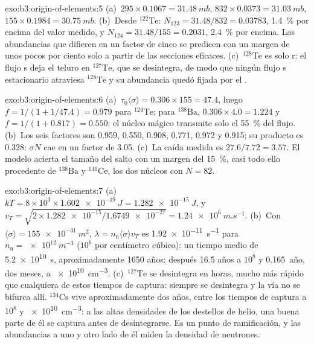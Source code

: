 \begin{solution}{exo:b3:origin-of-elements:5}
(a)~$295\times0.1067 = \qty{31.48}{mb}$, $832\times0.0373 =
\qty{31.03}{mb}$, $155\times0.1984 = \qty{30.75}{mb}$. (b)~Desde
$^{122}\mathrm{Te}$: $N_{123} = 31.48/832 = \num{0.03783}$, \qty{1.4}{\percent}
por encima del valor medido, y $N_{124} = 31.48/155 = \num{0.2031}$,
\qty{2.4}{\percent} por encima. Las abundancias que difieren en un factor de cinco se
predicen con un margen de unos pocos por ciento solo a partir de las secciones eficaces.
(c)~$^{128}\mathrm{Te}$ es solo r: el flujo s deja el teluro en
$^{127}\mathrm{Te}$, que se desintegra, de modo que ningún flujo s estacionario atraviesa
$^{128}\mathrm{Te}$ y su abundancia quedó fijada por el .
\end{solution}

\begin{solution}{exo:b3:origin-of-elements:6}
(a)~$\tau_0\langle\sigma\rangle = 0.306\times155 = 47.4$, luego
$f = 1/(1 + 1/47.4) = \num{0.979}$ para $^{124}\mathrm{Te}$; para
$^{138}\mathrm{Ba}$, $0.306\times4.0 = 1.224$ y $f = 1/(1 + 0.817) =
\num{0.550}$: el núcleo mágico transmite solo el \qty{55}{\percent} del
flujo. (b)~Los seis factores son \num{0.959}, \num{0.550}, \num{0.908},
\num{0.771}, \num{0.972} y \num{0.915}; su producto es \num{0.328}:
$\sigma N$ cae en un factor de \num{3.05}. (c)~La caída medida es
$27.6/7.72 = 3.57$. El modelo acierta el tamaño del salto con un margen
del \qty{15}{\percent}, casi todo ello procedente de $^{138}\mathrm{Ba}$ y
$^{140}\mathrm{Ce}$, los dos núcleos con $N = 82$.
\end{solution}

\begin{solution}{exo:b3:origin-of-elements:7}
(a)~$kT = 8\times10^3\times\qty{1.602e-19}{J} = \qty{1.282e-15}{J}$, y
$v_T = \sqrt{2\times\num{1.282e-15}/\num{1.6749e-27}} =
\qty{1.24e6}{m.s^{-1}}$. (b)~Con $\langle\sigma\rangle =
\qty{155e-31}{m^2}$, $\lambda = n_\mathrm{n}\langle\sigma\rangle v_T$
es \qty{1.92e-11}{s^{-1}} para $n_\mathrm{n} = \qty{e12}{m^{-3}}$
($10^6$ por centímetro cúbico): un tiempo medio de \qty{5.2e10}{s}, aproximadamente
\num{1650} años; después \num{16.5} años a $10^8$ y \num{0.165}~año,
dos meses, a \qty{e10}{cm^{-3}}. (c)~$^{127}\mathrm{Te}$ se desintegra en
horas, mucho más rápido que cualquiera de estos tiempos de captura: siempre se desintegra y
la vía no se bifurca allí. $^{134}\mathrm{Cs}$ vive aproximadamente dos
años, entre los tiempos de captura a $10^8$ y \qty{e10}{cm^{-3}}: a
las altas densidades de los destellos de helio, una buena parte de él se captura
antes de desintegrarse. Es un punto de ramificación, y las abundancias a uno y otro lado
de él miden la densidad de neutrones.
\end{solution}

